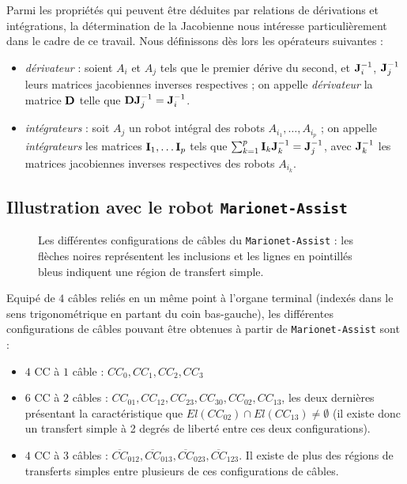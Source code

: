 Parmi les propri\'et\'es qui peuvent \^etre d\'eduites par relations de 
d\'erivations et int\'egrations, la d\'etermination de la Jacobienne nous 
int\'eresse particuli\`erement dans le cadre de ce travail. Nous d\'efinissons 
d\`es lors les op\'erateurs suivantes :

\begin{itemize}
 \item {\it d\'erivateur} : soient $A_i$ et $A_j$ tels que le premier d\'erive 
du second, et ${\bf J}^{-1}_i$, ${\bf J}^{-1}_j$ leurs matrices jacobiennes 
inverses respectives ; on appelle {\it d\'erivateur} la matrice ${\bf D}$ telle 
que $ {\bf D} {\bf J}^{-1}_j = {\bf J}^{-1}_i$.
 \item {\it int\'egrateurs} : soit $A_j$ un robot int\'egral des robots 
$A_{i_1}, \dots, A_{i_p}$ ; on appelle {\it int\'egrateurs} les matrices 
${\bf I}_1, \dots {\bf I}_p$ tels que $\sum_{k=1}^p {\bf I}_k {\bf J}^{-1}_k = 
{\bf J}^{-1}_j$, avec ${\bf J}^{-1}_k$ les matrices jacobiennes inverses 
respectives des robots $A_{i_k}$.
\end{itemize}


\subsection{Illustration avec le robot {\tt Marionet-Assist}}

\begin{figure}[!ht]
  \centering
    \def\svgwidth{.65\linewidth}
  
    \caption{\footnotesize{Les diff\'erentes configurations de c\^ables du 
{\tt Marionet-Assist} : les fl\`eches noires repr\'esentent les inclusions et 
les lignes en pointill\'es bleus indiquent une r\'egion de transfert simple.}}
\label{chap03:fig0}
\end{figure}

Equip\'e de $4$ c\^ables reli\'es en un m\^eme point \`a l'organe 
terminal (index\'es dans le sens trigonom\'etrique en partant du coin 
bas-gauche), les diff\'erentes confi\-gurations de c\^ables pouvant \^etre 
obtenues \`a partir de {\tt Marionet-Assist} sont :
\begin{itemize}
 \item $4$ CC \`a $1$ c\^able : $CC_0, CC_1, CC_2, CC_3$
  \item $6$ CC \`a $2$ c\^ables : $CC_{01}, CC_{12}, CC_{23}, CC_{30}, 
CC_{02}, 
CC_{13}$, les deux derni\`eres pr\'esentant la caract\'eristique que 
$El(CC_{02}) \cap El(CC_{13}) \neq \emptyset$ (il existe donc un transfert 
simple \`a 2 degr\'es de libert\'e entre ces deux configurations).
  \item $4$ CC \`a $3$ c\^ables : $\overline{CC}_{012}, \overline{CC}_{013}, 
\overline{CC}_{023}, \overline{CC}_{123}$. Il existe de plus des r\'egions de 
transferts simples entre plusieurs de ces configurations de c\^ables.
\end{itemize}

